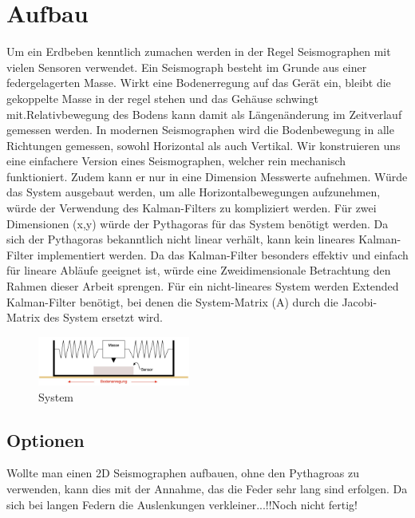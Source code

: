 \documentclass[11pt,a4paper]{article}
\begin{document}
\section{Aufbau}
Um ein Erdbeben kenntlich zumachen werden in der Regel Seismographen mit vielen Sensoren verwendet. 
Ein Seismograph besteht im Grunde aus einer federgelagerten Masse. Wirkt eine Bodenerregung auf das Gerät ein, bleibt die gekoppelte Masse in der regel stehen und das Gehäuse schwingt mit.Relativbewegung des Bodens kann damit als Längenänderung im Zeitverlauf gemessen werden. In modernen Seismographen wird die Bodenbewegung in alle Richtungen gemessen, sowohl Horizontal als auch Vertikal. 
Wir konstruieren uns eine einfachere Version eines Seismographen, welcher rein mechanisch funktioniert. Zudem kann er nur in eine Dimension Messwerte aufnehmen. Würde das System ausgebaut werden, um alle Horizontalbewegungen aufzunehmen, würde der Verwendung des Kalman-Filters zu kompliziert werden. Für zwei Dimensionen (x,y) würde der Pythagoras für das System benötigt werden. Da sich der Pythagoras bekanntlich nicht linear verhält, kann kein lineares Kalman-Filter implementiert werden. Da das Kalman-Filter besonders effektiv und einfach für lineare Abläufe geeignet ist, würde eine Zweidimensionale Betrachtung den Rahmen dieser Arbeit sprengen. Für ein nicht-lineares System werden Extended Kalman-Filter benötigt, bei denen die System-Matrix (A) durch die Jacobi-Matrix des System ersetzt wird.

\begin{figure}
 \begin{center}
 \includegraphics[width=5cm]{papers/erdbeben/Apperatur}
 \caption{System}
 \end{center}
\end{figure}


\subsection{Optionen}
Wollte man einen 2D Seismographen aufbauen, ohne den Pythagroas zu verwenden, kann dies mit der Annahme, das die Feder sehr lang sind erfolgen. Da sich bei langen Federn die Auslenkungen verkleiner...!!Noch nicht fertig!
\end{document}
